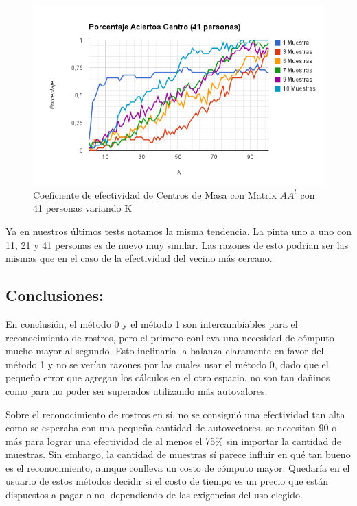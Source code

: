 \begin{figure}[H] \includegraphics[width=1\textwidth]{img/imagef15.png} \caption{Coeficiente de
    efectividad de Centros de Masa  con Matrix $AA^t$ con 41 personas variando K} \end{figure}


Ya en nuestros últimos tests notamos la misma tendencia. La pinta uno a uno con 11, 21 y 41 personas
es de nuevo muy similar. Las razones de esto podrían ser las mismas que en el caso de la efectividad
del vecino más cercano.


\subsection{Conclusiones:}

En conclusión, el método 0 y el método 1 son intercambiables para el reconocimiento de rostros, pero
el primero conlleva una necesidad de cómputo mucho mayor al segundo. Esto inclinaría la balanza
claramente en favor del método 1 y no se verían razones por las cuales usar el método 0, dado que el peque\~no error que agregan los c\'alculos en el otro espacio, no son tan da\~ninos como para no poder ser superados utilizando m\'as autovalores.

Sobre el reconocimiento de rostros en sí, no se consiguió una efectividad tan alta como se
esperaba con una peque\~na cantidad de autovectores, se necesitan 90 o más para lograr una efectividad de al menos el 75\% sin importar
la cantidad de muestras. Sin embargo, la cantidad de muestras sí parece influir en qué tan bueno es
el reconocimiento, aunque conlleva un costo de cómputo mayor. Quedaría en el usuario de estos
métodos decidir si el costo de tiempo es un precio que están dispuestos a pagar o no, dependiendo de
las exigencias del uso elegido.


